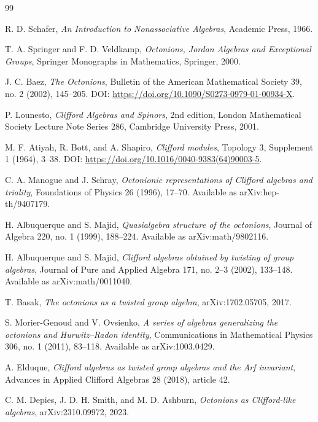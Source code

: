 \documentclass[11pt]{article}
\begin{document}
\begin{thebibliography}{99}

R. D. Schafer,
\emph{An Introduction to Nonassociative Algebras},
Academic Press, 1966.

T. A. Springer and F. D. Veldkamp,
\emph{Octonions, Jordan Algebras and Exceptional Groups},
Springer Monographs in Mathematics, Springer, 2000.

J. C. Baez,
\emph{The Octonions},
Bulletin of the American Mathematical Society 39, no. 2 (2002), 145--205.
DOI: \url{https://doi.org/10.1090/S0273-0979-01-00934-X}.

P. Lounesto,
\emph{Clifford Algebras and Spinors},
2nd edition, London Mathematical Society Lecture Note Series 286,
Cambridge University Press, 2001.

M. F. Atiyah, R. Bott, and A. Shapiro,
\emph{Clifford modules},
Topology 3, Supplement 1 (1964), 3--38.
DOI: \url{https://doi.org/10.1016/0040-9383(64)90003-5}.

C. A. Manogue and J. Schray,
\emph{Octonionic representations of Clifford algebras and triality},
Foundations of Physics 26 (1996), 17--70.
Available as arXiv:hep-th/9407179.


H. Albuquerque and S. Majid,
\emph{Quasialgebra structure of the octonions},
Journal of Algebra 220, no. 1 (1999), 188--224.
Available as arXiv:math/9802116.

H. Albuquerque and S. Majid,
\emph{Clifford algebras obtained by twisting of group algebras},
Journal of Pure and Applied Algebra 171, no. 2--3 (2002), 133--148.
Available as arXiv:math/0011040.

T. Basak,
\emph{The octonions as a twisted group algebra},
arXiv:1702.05705, 2017.

S. Morier-Genoud and V. Ovsienko,
\emph{A series of algebras generalizing the octonions and Hurwitz--Radon identity},
Communications in Mathematical Physics 306, no. 1 (2011), 83--118.
Available as arXiv:1003.0429.

A. Elduque,
\emph{Clifford algebras as twisted group algebras and the Arf invariant},
Advances in Applied Clifford Algebras 28 (2018), article 42.

C. M. Depies, J. D. H. Smith, and M. D. Ashburn,
\emph{Octonions as Clifford-like algebras},
arXiv:2310.09972, 2023.

\end{thebibliography}
\end{document}
